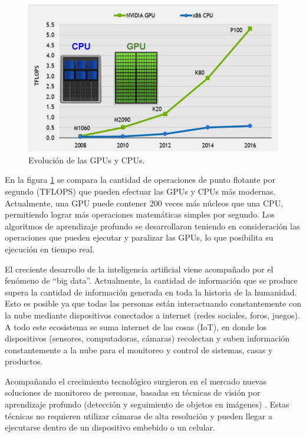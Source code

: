 \begin{figure}[ht]
	\centering
	\includegraphics[scale=.8]{./Figures/cpuGPU.jpg}
	\caption{Evolución de las GPUs y CPUs\protect\footnotemark.}
	\label{fig:cpuGPU}
\end{figure}


En la figura \ref{fig:cpuGPU} se compara la cantidad de operaciones de punto flotante por segundo (TFLOPS) \citep{TFLOPS} que pueden efectuar las GPUs y CPUs más modernas. Actualmente, una GPU puede contener 200 veces más núcleos que una CPU, permitiendo lograr más operaciones matemáticas simples por segundo. Los algoritmos de aprendizaje profundo se desarrollaron teniendo en consideración las operaciones que pueden ejecutar y paralizar las GPUs, lo que posibilita su ejecución en tiempo real.

El creciente desarrollo de la inteligencia artificial viene acompañado por el fenómeno de ``big data''. Actualmente, la cantidad de información que se produce supera la cantidad de información generada en toda la historia de la humanidad. Esto es posible ya que todas las personas están interactuando constantemente con la nube mediante dispositivos conectados a internet (redes sociales, foros, juegos). A todo este ecosistema se suma internet de las cosas (IoT), en donde los dispositivos (sensores, computadoras, cámaras) recolectan y suben información constantemente a la nube para el monitoreo y control de sistemas, casas y productos.

\newpage

Acompañando el crecimiento tecnológico surgieron en el mercado nuevas soluciones de monitoreo de personas, basadas en técnicas de visión por aprendizaje profundo (detección y seguimiento de objetos en imágenes) . Estas técnicas no requieren utilizar cámaras de alta resolución y pueden llegar a ejecutarse dentro de un dispositivo embebido o un celular.

